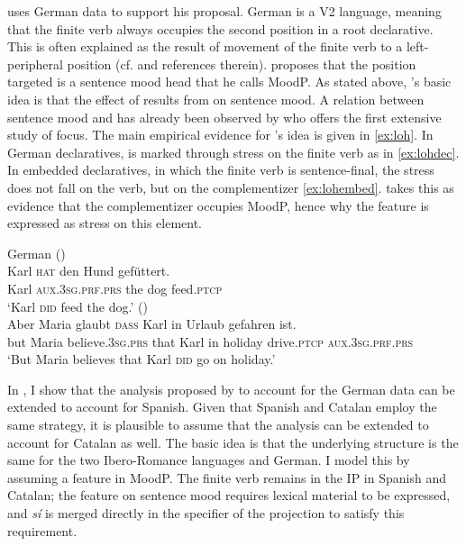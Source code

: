 \citet{Lohnstein2015} uses German data to support his proposal. German is a V2 language, meaning that the finite verb always occupies the second position in a root declarative. This is often explained as the result of  movement of the finite verb  to a left-peripheral position (cf. \citealt{Roberts2001} and references therein). \citet{Lohnstein2015} proposes that the position targeted is a sentence mood head that he calls MoodP.  
As stated above, \citeauthor{Lohnstein2015}'s  basic idea is that the effect of  results from  on sentence mood. A relation between sentence mood and   has already been observed by \citet{Hohle1992}  who offers the first extensive study of  focus. 
The main empirical evidence for \citeauthor{Lohnstein2015}'s idea is given in \eqref{ex:loh}. In German declaratives,  is marked through stress on the finite verb as in \eqref{ex:lohdec}.  In embedded declaratives, in which the finite verb is sentence-final, the stress does not fall on the verb, but on the complementizer \eqref{ex:lohembed}. \citet{Lohnstein2015} takes this as evidence that the complementizer occupies MoodP, hence why the  feature is expressed as stress on this element.

\ea \label{ex:loh} German
\ea\label{ex:lohdec}
		 (\citealt[1: ex 1a]{Lohnstein2015})\\
\gll Karl \textsc{hat} den Hund gefüttert. \\
		Karl \textsc{aux.3sg.prf.prs} the dog feed.\textsc{ptcp}\\
		\glt `Karl \textsc{did} feed the dog.' 
		\ex \label{ex:lohembed} (\citealt[2: ex 1e]{Lohnstein2015})\\

		\gll Aber Maria glaubt \textsc{dass} Karl in Urlaub gefahren ist. \\
but Maria believe.\textsc{3sg.prs} that Karl in holiday drive.\textsc{ptcp} \textsc{aux.3sg.prf.prs}\\
\glt `But Maria believes that Karl \textsc{did} go on holiday.'
	\z
\z\largerpage


In \citet{Kocher2017,Kocher2018b}, I show that the analysis proposed by \citet{Lohnstein2015} to account for the German data can be extended to account for Spanish. Given  that  Spanish and Catalan employ the same  strategy, it is plausible to assume that the analysis can  be extended to  account for Catalan as well. The basic idea is that the underlying structure is the same for the two Ibero-Romance languages and German.  I model this by assuming  a  feature in MoodP. The finite verb  remains in the IP in Spanish and Catalan; the  feature on sentence mood requires lexical material to be expressed, and \emph{sí} is merged directly in the specifier of the projection to satisfy this requirement. 

